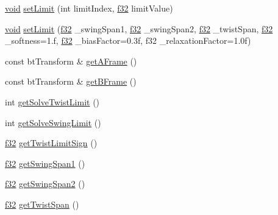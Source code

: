 \begin{DoxyCompactItemize}
\item 
\mbox{\hyperlink{_thread_8h_af1e856da2e658414cb2456cb6f7ebc66}{void}} \mbox{\hyperlink{classnjli_1_1_physics_constraint_cone_twist_aeed1b0161940309464c6f5f56de1dd22}{set\+Limit}} (int limit\+Index, \mbox{\hyperlink{_util_8h_a5f6906312a689f27d70e9d086649d3fd}{f32}} limit\+Value)
\item 
\mbox{\hyperlink{_thread_8h_af1e856da2e658414cb2456cb6f7ebc66}{void}} \mbox{\hyperlink{classnjli_1_1_physics_constraint_cone_twist_a708e02ef79f7e67c13eb5bfb82a76115}{set\+Limit}} (\mbox{\hyperlink{_util_8h_a5f6906312a689f27d70e9d086649d3fd}{f32}} \+\_\+swing\+Span1, \mbox{\hyperlink{_util_8h_a5f6906312a689f27d70e9d086649d3fd}{f32}} \+\_\+swing\+Span2, \mbox{\hyperlink{_util_8h_a5f6906312a689f27d70e9d086649d3fd}{f32}} \+\_\+twist\+Span, \mbox{\hyperlink{_util_8h_a5f6906312a689f27d70e9d086649d3fd}{f32}} \+\_\+softness=1.f, \mbox{\hyperlink{_util_8h_a5f6906312a689f27d70e9d086649d3fd}{f32}} \+\_\+bias\+Factor=0.\+3f, f32 \+\_\+relaxation\+Factor=1.\+0f)
\item 
const bt\+Transform \& \mbox{\hyperlink{classnjli_1_1_physics_constraint_cone_twist_a1a17ffd697fdd1028e5e2518ea86b75a}{get\+A\+Frame}} ()
\item 
const bt\+Transform \& \mbox{\hyperlink{classnjli_1_1_physics_constraint_cone_twist_a5f3cb5d2c160fec5ec92de024df68a3c}{get\+B\+Frame}} ()
\item 
int \mbox{\hyperlink{classnjli_1_1_physics_constraint_cone_twist_aa9a5bdf9fcbebce5686c4fc630597dcc}{get\+Solve\+Twist\+Limit}} ()
\item 
int \mbox{\hyperlink{classnjli_1_1_physics_constraint_cone_twist_abe8033d8ead97feb20871704c0ac81a0}{get\+Solve\+Swing\+Limit}} ()
\item 
\mbox{\hyperlink{_util_8h_a5f6906312a689f27d70e9d086649d3fd}{f32}} \mbox{\hyperlink{classnjli_1_1_physics_constraint_cone_twist_acee80e920f51081de9354094379f7b11}{get\+Twist\+Limit\+Sign}} ()
\item 
\mbox{\hyperlink{_util_8h_a5f6906312a689f27d70e9d086649d3fd}{f32}} \mbox{\hyperlink{classnjli_1_1_physics_constraint_cone_twist_a027923af16628517d65094297cb3a575}{get\+Swing\+Span1}} ()
\item 
\mbox{\hyperlink{_util_8h_a5f6906312a689f27d70e9d086649d3fd}{f32}} \mbox{\hyperlink{classnjli_1_1_physics_constraint_cone_twist_a08296e8ff84c002fda396b348ec622de}{get\+Swing\+Span2}} ()
\item 
\mbox{\hyperlink{_util_8h_a5f6906312a689f27d70e9d086649d3fd}{f32}} \mbox{\hyperlink{classnjli_1_1_physics_constraint_cone_twist_a38d2f9a65c88de728a2a1f5d3255ae24}{get\+Twist\+Span}} ()

\end{DoxyCompactItemize}
